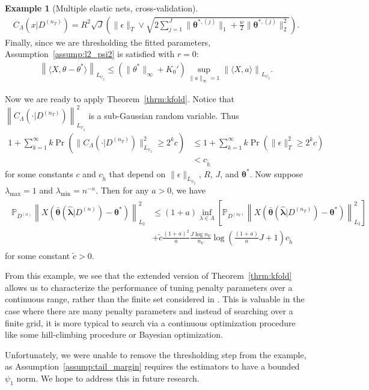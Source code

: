 \documentclass[12pt]{article} %
\theoremstyle{definition}
\newtheorem{example}{Example}
\begin{document}
\begin{example}[Multiple elastic nets, cross-validation]
	\begin{align}
	C_\Lambda(x | D^{(n_T)})
	=
	R^2
	\sqrt{J}
	\left (
	\|\epsilon\|_{T}
	\vee \sqrt{2\sum_{j=1}^J
	\|\boldsymbol{\theta}^{*,(j)}\|_1
	+ \frac{w}{2}\|\boldsymbol{\theta}^{*,(j)}\|_2^2}
	\right ).
	\end{align}
	Finally, since we are thresholding the fitted parameters, Assumption~\ref{assump:l2_psi2} is satisfied with $r = 0$:
	\begin{align}
	\left\| \langle X, \theta - \theta^* \rangle \right \|_{L_{\psi_2}}
	\le
	(\|\theta^*\|_\infty + K_0')
	\sup_{\|a\|_\infty = 1} \left\| \langle X, a \rangle \right \|_{L_{\psi_2}}.
	\end{align}
	
	Now we are ready to apply Theorem~\ref{thrm:kfold}.
	Notice that
	$\left \| C_\Lambda(\cdot | D^{(n_T)}) \right \|_{L_{\psi_2}}^2$
	is a sub-Gaussian random variable.
	Thus
	\begin{align}
	1 + \sum_{k = 1}^\infty k \Pr \left (
	\| C_\Lambda(\cdot | D^{(n_T)}) \|_{L_{\psi_2}}^2 \ge 2^k c
	\right )
	& \le
	1 + \sum_{k = 1}^\infty k \Pr \left (
	\| \epsilon\|_T^2 \ge 2^k c
	\right )\\
	& < c_{\tilde{h}}
	\end{align}
	for some constants $c$ and $c_{\tilde{h}}$ that depend on $\|\epsilon\|_{L_{\psi_{2}}}$, $R$, $J$, and $\boldsymbol{\theta}^*$.
	Now suppose $\lambda_{\max} = 1$ and $\lambda_{\min} = n^{-\kappa}$.
	Then for any $a > 0$, we have
	\begin{align}
	\begin{split}
	\mathbb{P}_{D^{(n)}}
	\left \|
	X \left(
	\bar{\boldsymbol{\theta}}(\hat{\boldsymbol{\lambda}}|D^{(n)})
	- \boldsymbol{\theta}^*
	\right)
	\right \|_{L_{2}}^{2}
	& \le	(1+a)
	\inf_{\lambda\in\Lambda}
	\left[
	\mathbb{P}_{D^{(n_{T})}}
	\left \|
	X \left(
	\bar{\boldsymbol{\theta}}(\hat{\boldsymbol{\lambda}}|D^{(n_T)})
	- \boldsymbol{\theta}^*
	\right)
	\right \|_{L_{2}}^{2}
	\right] \\
	& + \tilde{c} \frac{\left(1+a\right)^{2}}{a}
	\frac{J\log n_{V}}{n_{V}}
	\log\left(\frac{\left(1+a\right)}{a} J +1\right)
	c_{\tilde{h}}
	\end{split}
	\end{align}
	for some constant $\tilde{c} > 0$.
	
	From this example, we see that the extended version of Theorem~\ref{thrm:kfold} allows us to characterize the performance of tuning penalty parameters over a continuous range, rather than the finite set considered in \citet{lecue2012oracle}.
	This is valuable in the case where there are many penalty parameters and instead of searching over a finite grid, it is more typical to search via a continuous optimization procedure like some hill-climbing procedure or Bayesian optimization.
	
	Unfortunately, we were unable to remove the thresholding step from the example, as Assumption~\ref{assump:tail_margin} requires the estimators to have a bounded $\psi_1$ norm. We hope to address this in future research.
\end{example}
\end{document}
